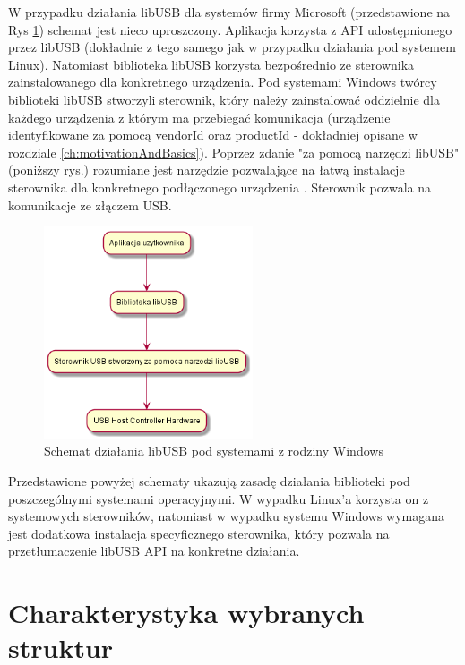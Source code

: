 \documentclass{BscUS}
\begin{document}
\noindent W przypadku działania libUSB dla systemów firmy Microsoft (przedstawione na Rys \ref{fig:libUsbSchemaWindows}) schemat jest nieco uproszczony. Aplikacja korzysta z API udostępnionego przez libUSB (dokładnie z tego samego jak w przypadku działania pod systemem Linux). Natomiast biblioteka libUSB korzysta bezpośrednio ze sterownika zainstalowanego dla konkretnego urządzenia. Pod systemami Windows twórcy biblioteki libUSB stworzyli sterownik, który należy zainstalować oddzielnie dla każdego urządzenia z którym ma przebiegać komunikacja (urządzenie identyfikowane za pomocą vendorId oraz productId - dokładniej opisane w rozdziale \ref{ch:motivationAndBasics}). Poprzez zdanie "za pomocą narzędzi libUSB" (poniższy rys.) rozumiane jest narzędzie pozwalające na łatwą instalacje sterownika dla konkretnego podłączonego urządzenia \cite{zadig}. Sterownik pozwala na komunikacje ze złączem USB.
\begin{figure}[H]
\centering
\includegraphics[width=0.55\textwidth]{./img/libUsbSchemaWindows}
\caption{Schemat działania libUSB pod systemami z rodziny Windows}
\label{fig:libUsbSchemaWindows}
\end{figure}
\noindent Przedstawione powyżej schematy ukazują zasadę działania biblioteki pod poszczególnymi systemami operacyjnymi. W wypadku Linux'a korzysta on z systemowych sterowników, natomiast w wypadku systemu Windows wymagana jest dodatkowa instalacja specyficznego sterownika, który pozwala na przetłumaczenie libUSB API na konkretne działania.

\section{Charakterystyka wybranych struktur}
\end{document}
